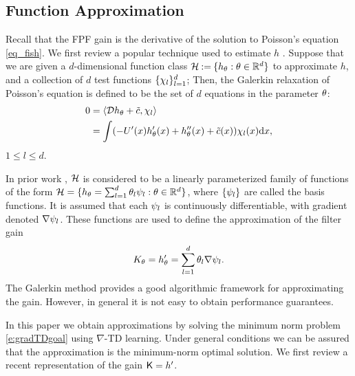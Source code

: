 
\subsection{Function Approximation}

Recall that the FPF gain is the derivative of the solution to Poisson's equation \eqref{eq_fish}.
We first review a popular technique used to estimate $h$ \cite{yanmehmey13,yanlaumehmey16}.
Suppose that we are given a $d$-dimensional  function class
${\cal H}  \mathbin{:=} \{h_{\theta} : \theta \in \mathbb{R}^d\}$ to approximate $h$, and a collection of $d$ test functions $\{\chi_{l}\}_{l=1}^{d}$; Then, the Galerkin relaxation of Poisson's equation is defined to be the set of $d$ equations in the parameter $\theta$:
\begin{equation}
\begin{aligned}
0 &= \langle \clD h_{\param}+\tilc, \test_{l} \rangle \\
&= \int (-U'(x) h_{\param}'(x)+ h_{\param}''(x)+\tilc (x))\test_{l}(x) \ud x,
\end{aligned}
\label{eq_weak_formulation}
\end{equation}
$ 1\leq l \leq d$.


In prior work \cite{yanmehmey13,yanlaumehmey16}, ${\cal H}$ is considered to be a linearly parameterized family of functions of the form ${\cal H} =\{ h_{\theta} = \sum_{l=1}^{d}\theta_{l}\psi_{l} : \theta\in\mathbb{R}^d\}$, where $\{\psi_l\}$ are called the basis functions. It is assumed that each $\psi_l$ is continuously differentiable,  with gradient denoted   $\nabla \psi_{l} $. These   functions are used to define the approximation of the filter gain
\begin{equation}
K_\param = h_{\param}' = \sum_{l=1}^{d}\param_{l}\gradbasis_{l}.
\label{eq_basis_galerkin}
\end{equation}
The
Galerkin method provides a good algorithmic framework for approximating the gain. However, in general it is not easy to obtain performance guarantees.

In this paper we obtain approximations by solving  the minimum norm problem \eqref{e:gradTDgoal} using $\nabla$-TD learning.  Under general conditions we can be assured that the approximation is the minimum-norm optimal solution.   We first review a recent representation of the gain $\text{\sf K} = h'$.



